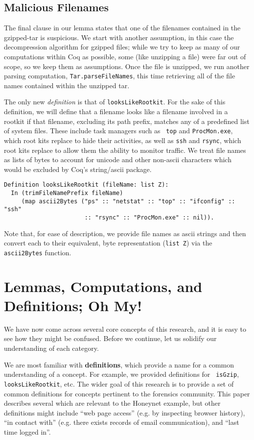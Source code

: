 \documentclass[nocopyrightspace]{sigplanconf}
\begin{document}
\subsection{Malicious Filenames}

The final clause in our lemma states that one of the filenames contained in
the gzipped-tar is suspicious. We start with  another assumption, in this case
the decompression algorithm for gzipped files; while we try to keep as many of
our computations within Coq as possible, some (like unzipping a file) were far
out of scope, so we keep them as assumptions. Once the file is unzipped, we
run another parsing computation, {\tt Tar.parseFileNames}, this time
retrieving all of the file names contained within the unzipped tar.

The only new {\it definition} is that of {\tt looksLikeRootkit}. For the sake
of this definition, we will define that a filename looks like a filename
involved in a rootkit if that filename, excluding its path prefix, matches any
of a predefined list of system files. These include task managers such as {\tt
top} and {\tt ProcMon.exe}, which root kits replace to hide their activities,
as well as {\tt ssh} and {\tt rsync}, which root kits replace to allow them
the ability to monitor traffic. We treat file names as lists of bytes to
account for unicode and other non-ascii characters which would be excluded by
Coq's string/ascii package.

\begin{lstlisting}
Definition looksLikeRootkit (fileName: list Z):
  In (trimFileNamePrefix fileName) 
     (map ascii2Bytes ("ps" :: "netstat" :: "top" :: "ifconfig" :: "ssh"
                       :: "rsync" :: "ProcMon.exe" :: nil)).
\end{lstlisting}

Note that, for ease of description, we provide file names as ascii strings and
then convert each to their equivalent, byte representation ({\tt list Z}) via
the {\tt ascii2Bytes} function.

\section{Lemmas, Computations, and Definitions; Oh My!}

We have now come across several core concepts of this research, and it is easy
to see how they might be confused. Before we continue, let us solidify our
understanding of each category.

We are most familiar with {\bf definitions}, which provide a name for a common
understanding of a concept. For example, we provided definitions for {\tt
isGzip}, {\tt looksLikeRootkit}, etc. The wider goal of this research is to
provide a set of common definitions for concepts pertinent to the forensics
community. This paper describes several which are relevant to the Honeynet
example, but other definitions might include ``web page access'' (e.g. by
inspecting browser history), ``in contact with'' (e.g. there exists records of
email communication), and ``last time logged in''.
\end{document}
